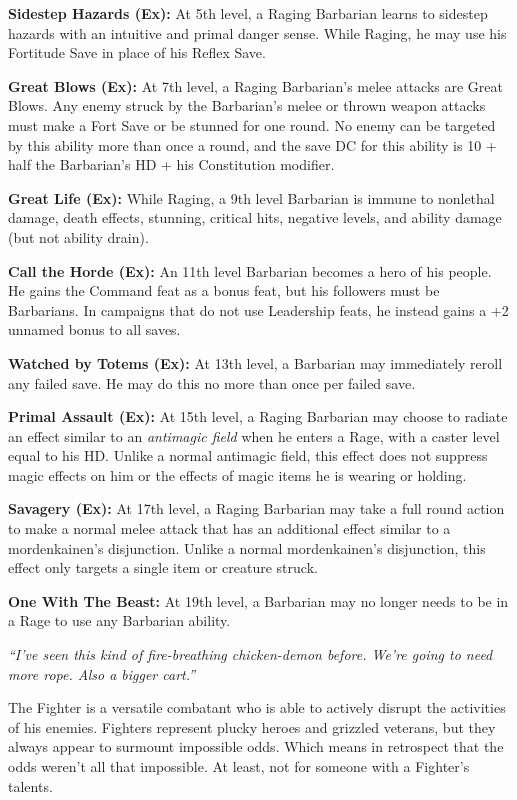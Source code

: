 \documentclass[10pt]{article}
\newcommand{\ability}[2]{\smallskip \noindent \textbf{#1} #2}
\newcommand{\classname}[1]{\noindent{\huge \textbf{#1}}}
\newcommand{\quot}[1]{\emph{#1}\medskip}
\newcommand{\desc}[1]{#1 \medskip}
\newcommand{\spell}[1]{\emph{#1}}
\begin{document}
\ability{Sidestep Hazards (Ex):}{At 5th level, a Raging Barbarian learns to sidestep hazards with an intuitive and primal danger sense. While Raging, he may use his Fortitude Save in place of his Reflex Save.}

\ability{Great Blows (Ex):}{At 7th level, a Raging Barbarian's melee attacks are Great Blows. Any enemy struck by the Barbarian's melee or thrown weapon attacks must make a Fort Save or be stunned for one round. No enemy can be targeted by this ability more than once a round, and the save DC for this ability is 10 + half the Barbarian's HD + his Constitution modifier.}

\ability{Great Life (Ex):}{While Raging, a 9th level Barbarian is immune to nonlethal damage, death effects, stunning, critical hits, negative levels, and ability damage (but not ability drain).}

\ability{Call the Horde (Ex):}{An 11th level Barbarian becomes a hero of his people. He gains the Command feat as a bonus feat, but his followers must be Barbarians. In campaigns that do not use Leadership feats, he instead gains a +2 unnamed bonus to all saves.}

\ability{Watched by Totems (Ex):}{At 13th level, a Barbarian may immediately reroll any failed save. He may do this no more than once per failed save.}

\ability{Primal Assault (Ex):}{At 15th level, a Raging Barbarian may choose to radiate an effect similar to an \spell{antimagic field} when he enters a Rage, with a caster level equal to his HD. Unlike a normal antimagic field, this effect does not suppress magic effects on him or the effects of magic items he is wearing or holding.}

\ability{Savagery (Ex):}{At 17th level, a Raging Barbarian may take a full round action to make a normal melee attack that has an additional effect similar to a mordenkainen's disjunction. Unlike a normal mordenkainen's disjunction, this effect only targets a single item or creature struck.}

\ability{One With The Beast:}{At 19th level, a Barbarian may no longer needs to be in a Rage to use any Barbarian ability.}

\newpage

\classname{Fighter}

\quot{``I've seen this kind of fire-breathing chicken-demon before. We're going to need more rope. Also a bigger cart.''}

\desc{The Fighter is a versatile combatant who is able to actively disrupt the activities of his enemies. Fighters represent plucky heroes and grizzled veterans, but they always appear to surmount impossible odds. Which means in retrospect that the odds weren't all that impossible. At least, not for someone with a Fighter's talents.}
\end{document}

